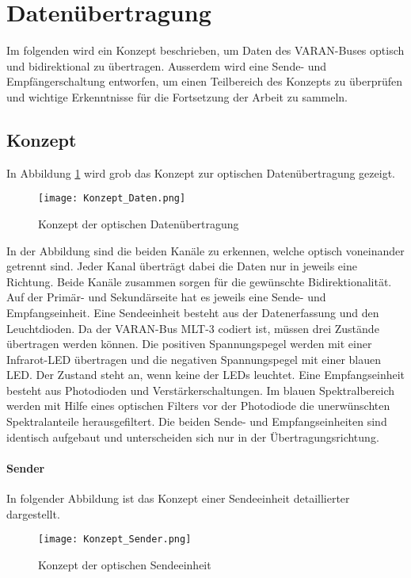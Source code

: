 \section{Datenübertragung}
\label{sec:Daten}
Im folgenden wird ein Konzept beschrieben, um Daten des VARAN-Buses optisch und bidirektional zu übertragen. Ausserdem wird eine Sende- und Empfängerschaltung entworfen, um einen Teilbereich des Konzepts zu überprüfen und wichtige Erkenntnisse für die Fortsetzung der Arbeit zu sammeln.  
\subsection{Konzept}
In Abbildung \ref{fig:Konzept_Daten} wird grob das Konzept zur optischen Datenübertragung gezeigt.

\begin{figure}[h]
	\centering
	\texttt{[image: Konzept\_Daten.png]}
	\caption{Konzept der optischen Datenübertragung}\label{fig:Konzept_Daten}
\end{figure}

In der Abbildung sind die beiden Kanäle zu erkennen, welche optisch voneinander getrennt sind. Jeder Kanal überträgt dabei die Daten nur in jeweils eine Richtung. Beide Kanäle zusammen sorgen für die gewünschte Bidirektionalität. Auf der Primär- und Sekundärseite hat es jeweils eine Sende- und Empfangseinheit. Eine Sendeeinheit besteht aus der Datenerfassung und den Leuchtdioden. Da der VARAN-Bus MLT-3 codiert ist, müssen drei Zustände übertragen werden können. Die positiven Spannungspegel werden mit einer Infrarot-LED übertragen und die negativen Spannungspegel mit einer blauen LED. Der Zustand \grqq steht an, wenn keine der LEDs leuchtet.
\newline
Eine Empfangseinheit besteht aus Photodioden und Verstärkerschaltungen. Im blauen Spektralbereich werden mit Hilfe eines optischen Filters vor der Photodiode die unerwünschten Spektralanteile herausgefiltert.
\newline Die beiden Sende- und Empfangseinheiten sind identisch aufgebaut und unterscheiden sich nur in der Übertragungsrichtung.

\paragraph{Sender}
In folgender Abbildung ist das Konzept einer Sendeeinheit detaillierter dargestellt.

\begin{figure}[h]
	\centering
	\texttt{[image: Konzept\_Sender.png]}
	\caption{Konzept der optischen Sendeeinheit}\label{fig:Konzept_Sender}
\end{figure}

